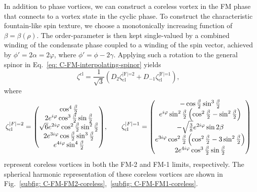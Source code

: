 In addition to phase vortices, we can construct a coreless vortex in the FM
phase that connects to a vortex state in the cyclic phase.
To construct the characteristic fountain-like spin texture, we choose a
monotonically increasing function of \(\beta=\beta(\rho)\).
The order-parameter is then kept single-valued by a combined winding of the
condensate phase coupled to a winding of the spin vector, achieved by
\(\phi'=2\alpha=2\varphi \), where \(\phi'=\phi-2\gamma \).
Applying such a rotation to the general spinor in
Eq.~\eqref{eq: C-FM-interpolating-spinor} yields
\begin{equation}\label{eq: C-FM-coreless-general}
    \zeta^\text{cl} = \frac{1}{\sqrt{3}}\left(D_2\zeta^\text{|F|=2}_\text{cl}
    + D_{-1}\zeta^\text{|F|=1}_\text{cl}\right),
\end{equation}
where
\begin{equation}\label{eq: C-FM-coreless-FM-limits}
    \zeta^{|F|=2}_\text{cl} =
    \mqty(
    \cos^4\frac{\beta}{2} \\
    2e^{i\varphi}\cos^3\frac{\beta}{2}\sin\frac{\beta}{2} \\
    \sqrt{6}e^{2i\varphi}\cos^2\frac{\beta}{2}\sin^2\frac{\beta}{2} \\
    2e^{3i\varphi}\cos\frac{\beta}{2}\sin^3\frac{\beta}{2} \\
    e^{4i\varphi}\sin^4\frac{\beta}{2}
    ), \qquad
    \zeta^{|F|=1}_\text{cl} =
    \mqty(
    -\cos\frac{\beta}{2}\sin^3\frac{\beta}{2} \\
    e^{i\varphi}\sin^2\frac{\beta}{2}\left(\cos^2\frac{\beta}{2}
    -\sin^2\frac{\beta}{2}\right) \\
    -\sqrt{\frac{3}{8}}e^{2i\varphi}\sin2\beta \\
    e^{3i\varphi}\cos^2\frac{\beta}{2}\left(\cos^2\frac{\beta}{2}
    -3\sin^2\frac{\beta}{2}\right) \\
    2e^{4i\varphi}\cos^3\frac{\beta}{2}\sin\frac{\beta}{2}
    )
\end{equation}
represent coreless vortices in both the FM-2 and FM-1 limits, respectively.
The spherical harmonic representation of these coreless vortices are shown
in Fig.~\ref{subfig: C-FM-FM2-coreless},~\ref{subfig: C-FM-FM1-coreless}.

